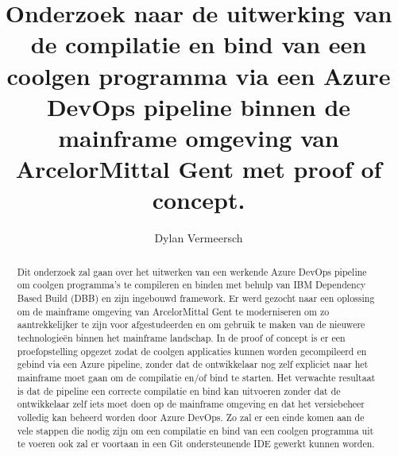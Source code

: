 \documentclass{hogent-article}
\title{Onderzoek naar de uitwerking van de compilatie en bind van een coolgen programma via een Azure \\DevOps pipeline binnen de mainframe omgeving van ArcelorMittal Gent met proof of concept.}
\author{Dylan Vermeersch}
\begin{document}
\begin{abstract}
  Dit onderzoek zal gaan over het uitwerken van een werkende Azure DevOps pipeline om coolgen programma's te compileren en binden met behulp van IBM Dependency Based Build (DBB) en zijn ingebouwd framework. Er werd gezocht naar een oplossing om de mainframe omgeving van ArcelorMittal Gent te moderniseren om zo aantrekkelijker te zijn voor afgestudeerden en om gebruik te maken van de nieuwere technologieën binnen het mainframe landschap. In de proof of concept is er een proefopstelling opgezet zodat de coolgen applicaties kunnen worden gecompileerd en gebind via een Azure pipeline, zonder dat de ontwikkelaar nog zelf expliciet naar het mainframe moet gaan om de compilatie en/of bind te starten. Het verwachte resultaat is dat de pipeline een correcte compilatie en bind kan uitvoeren zonder dat de ontwikkelaar zelf iets moet doen op de mainframe omgeving en dat het versiebeheer volledig kan beheerd worden door Azure DevOps. Zo zal er een einde komen aan de vele stappen die nodig zijn om een compilatie en bind van een coolgen programma uit te voeren ook zal er voortaan in een Git ondersteunende IDE gewerkt kunnen worden.
\end{abstract}

\tableofcontents



\printbibliography[heading=bibintoc]
\end{document}
